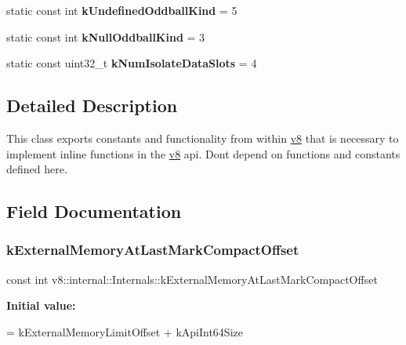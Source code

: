 \begin{DoxyCompactItemize}
static const int {\bfseries k\+Undefined\+Oddball\+Kind} = 5
\item 
\mbox{\label{classv8_1_1internal_1_1Internals_a72243c5512cb5cab9d10b6f29e775180}} 
static const int {\bfseries k\+Null\+Oddball\+Kind} = 3
\item 
\mbox{\label{classv8_1_1internal_1_1Internals_a258de87ae638f06a1deebccf4fd93c3f}} 
static const uint32\+\_\+t {\bfseries k\+Num\+Isolate\+Data\+Slots} = 4
\end{DoxyCompactItemize}


\subsection{Detailed Description}
This class exports constants and functionality from within \mbox{\hyperlink{namespacev8}{v8}} that is necessary to implement inline functions in the \mbox{\hyperlink{namespacev8}{v8}} api. Don\textquotesingle{}t depend on functions and constants defined here. 

\subsection{Field Documentation}
\mbox{\label{classv8_1_1internal_1_1Internals_ae4a0df1e5f5c58717a7ccd3dad602d19}} 
\subsubsection{\texorpdfstring{k\+External\+Memory\+At\+Last\+Mark\+Compact\+Offset}{kExternalMemoryAtLastMarkCompactOffset}}
{\footnotesize\ttfamily const int v8\+::internal\+::\+Internals\+::k\+External\+Memory\+At\+Last\+Mark\+Compact\+Offset\hspace{0.3cm}{\ttfamily [static]}}

{\bfseries Initial value\+:}
\begin{DoxyCode}
=
      kExternalMemoryLimitOffset + kApiInt64Size
\end{DoxyCode}
\mbox{\label{classv8_1_1internal_1_1Internals_ac38870732a7ff5fb135a78a911e9dbc6}} 
